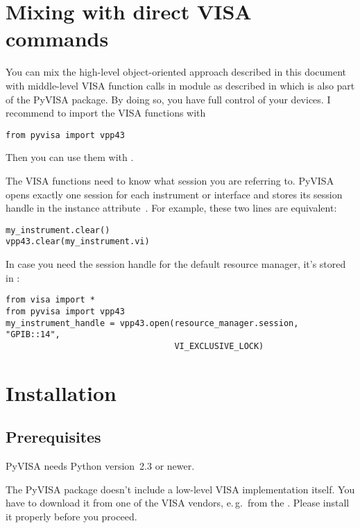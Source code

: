 \documentclass{howto}
\begin{document}
\section{Mixing with direct VISA commands}

You can mix the high-level object-oriented approach described in this document
with middle-level VISA function calls in module  as described in
 which is also part of the PyVISA package.  By doing so, you
have full control of your devices.  I recommend to import the VISA functions
with
\begin{verbatim}
from pyvisa import vpp43
\end{verbatim}
Then you can use them with .

The VISA functions need to know what session you are referring to.  PyVISA
opens exactly one session for each instrument or interface and stores its
session handle in the instance attribute~.  For example, these two
lines are equivalent:
\begin{verbatim}
my_instrument.clear()
vpp43.clear(my_instrument.vi)
\end{verbatim}

In case you need the session handle for the default resource manager, it's
stored in :
\begin{verbatim}
from visa import *
from pyvisa import vpp43
my_instrument_handle = vpp43.open(resource_manager.session, "GPIB::14",
                                  VI_EXCLUSIVE_LOCK)
\end{verbatim}

\section{Installation}

\subsection{Prerequisites}

PyVISA needs Python version~2.3 or newer.

The PyVISA package doesn't include a low-level VISA implementation itself.  You
have to download it from one of the VISA vendors, e.\,g.\ from the
.  Please install
it properly before you proceed.
\end{document}
